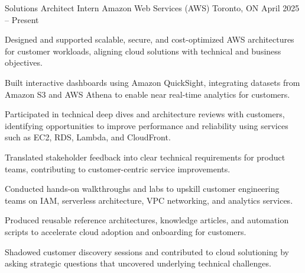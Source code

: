 
\begin{cventries}

\cventry
{Solutions Architect Intern} %
{Amazon Web Services (AWS)} %
{Toronto, ON} %
{April 2025 – Present} %
{ %
  \begin{cvitems}
    \item {Designed and supported scalable, secure, and cost-optimized AWS architectures for customer workloads, aligning cloud solutions with technical and business objectives.}
    \item {Built interactive dashboards using Amazon QuickSight, integrating datasets from Amazon S3 and AWS Athena to enable near real-time analytics for customers.}
    \item {Participated in technical deep dives and architecture reviews with customers, identifying opportunities to improve performance and reliability using services such as EC2, RDS, Lambda, and CloudFront.}
    \item {Translated stakeholder feedback into clear technical requirements for product teams, contributing to customer-centric service improvements.}
    \item {Conducted hands-on walkthroughs and labs to upskill customer engineering teams on IAM, serverless architecture, VPC networking, and analytics services.}
    \item {Produced reusable reference architectures, knowledge articles, and automation scripts to accelerate cloud adoption and onboarding for customers.}
    \item {Shadowed customer discovery sessions and contributed to cloud solutioning by asking strategic questions that uncovered underlying technical challenges.}
  \end{cvitems}
}


\end{cventries}

